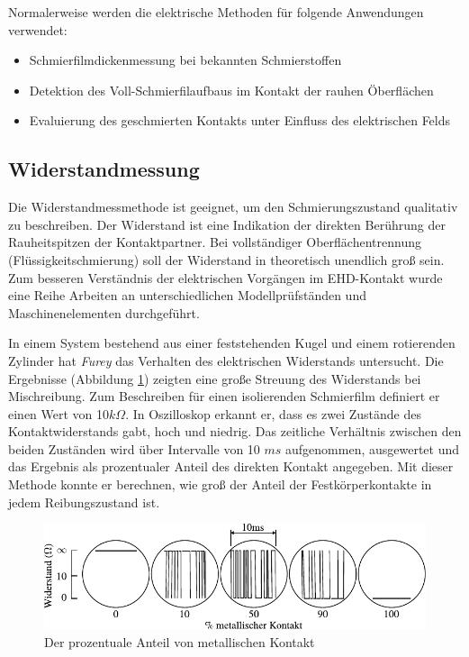 Normalerweise werden die elektrische Methoden für folgende Anwendungen verwendet:
\begin{itemize}
    \item Schmierfilmdickenmessung bei bekannten Schmierstoffen
    \item Detektion des Voll-Schmierfilaufbaus im Kontakt der rauhen Öberflächen
    \item Evaluierung des geschmierten Kontakts unter Einfluss des elektrischen Felds
\end{itemize}

\subsection{Widerstandmessung}
\label{sub:wiederstandmessung}

Die Widerstandmessmethode ist geeignet, um den Schmierungszustand qualitativ zu beschreiben.
Der Widerstand ist eine Indikation der direkten Berührung der Rauheitspitzen der Kontaktpartner.
Bei vollständiger Oberflächentrennung (Flüssigkeitschmierung) soll der Widerstand in theoretisch unendlich groß sein.
Zum besseren Verständnis der elektrischen Vorgängen im EHD-Kontakt wurde eine Reihe Arbeiten an unterschiedlichen Modellprüfständen und Maschinenelementen durchgeführt.

In einem System bestehend aus einer feststehenden Kugel und einem rotierenden Zylinder hat \textit{Furey} \cite{furey_1961} das Verhalten des elektrischen Widerstands untersucht.
Die Ergebnisse (Abbildung \ref{fig:resistance_vs_time_furey}) zeigten eine große Streuung des Widerstands bei Mischreibung.
Zum Beschreiben für einen isolierenden Schmierfilm definiert er einen Wert von 10$k\Omega$.
In Oszilloskop erkannt er, dass es zwei Zustände des Kontaktwiderstands gabt, hoch und niedrig.
Das zeitliche Verhältnis zwischen den beiden Zuständen wird über Intervalle von 10 $ms$ aufgenommen, ausgewertet und das Ergebnis als prozentualer Anteil des direkten Kontakt angegeben.
Mit dieser Methode konnte er berechnen, wie groß der Anteil der Festkörperkontakte in jedem Reibungszustand ist.
\begin{figure}[htb]
    \centering
    \includegraphics[]{./images/resistance_vs_time_furey.pdf}
    \caption{Der prozentuale Anteil von metallischen Kontakt \cite{furey_1961}}
    \label{fig:resistance_vs_time_furey}
\end{figure}
%

